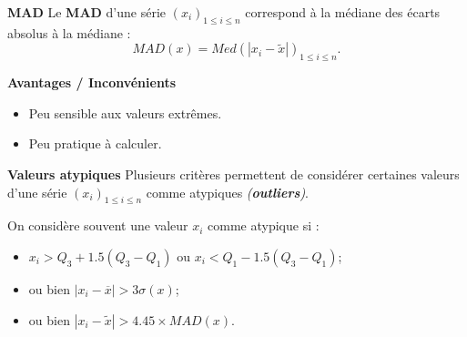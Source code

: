 \documentclass[aspectratio=169,xcolor=dvipsnames]{beamer}
\begin{document}
\begin{frame}
	\begin{block}{\textbf{MAD}}
	Le \textbf{MAD} d'une série $(x_i)_{1 \leqslant i \leqslant n}$ correspond à la médiane des écarts absolus à la médiane :
		\[
		MAD (x) = Med \left( \left| x_i - \widetilde{x} \right| \right)_{1 \leqslant i \leqslant n}.
		\]
	\end{block}
	
	\begin{exampleblock}{\textbf{Avantages / Inconvénients}}
		\begin{itemize}
		\item[\faPlusCircle] Peu sensible aux valeurs extrêmes.
		\item[\faMinusCircle] Peu pratique à calculer.
		\end{itemize}
	\end{exampleblock}
\end{frame}

\begin{frame}
	\begin{block}{\textbf{Valeurs atypiques}}
	Plusieurs critères permettent de considérer certaines valeurs d'une série $(x_i)_{1 \leqslant i \leqslant n}$ comme atypiques \emph{(\textbf{outliers})}.
	
	On considère souvent une valeur $x_i$ comme atypique si :
		\begin{itemize}
		\item $x_i > Q_3 + 1.5(Q_3-Q_1)$ ou $x_i<Q_1 - 1.5(Q_3-Q_1)$;
		\item ou bien $\left| x_i - \overline{x} \right| > 3 \sigma(x)$;
		\item ou bien $\left| x_i - \widetilde{x} \right| > 4.45 \times MAD(x)$.
		\end{itemize}
	\end{block}
\end{frame}
\end{document}

